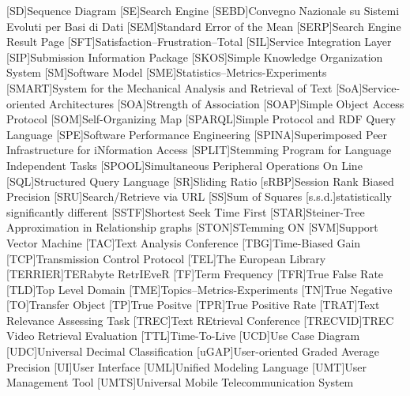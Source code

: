 [SD]{Sequence Diagram}
[SE]{Search Engine}
[SEBD]{Convegno Nazionale su Sistemi Evoluti per Basi di Dati}
[SEM]{Standard Error of the Mean}
[SERP]{Search Engine Result Page}
[SFT]{Satisfaction--Frustration--Total}
[SIL]{Service Integration Layer}
[SIP]{Submission Information Package}
[SKOS]{Simple Knowledge Organization System}
[SM]{Software Model}
[SME]{Statistics--Metrics-Experiments}
[SMART]{System for the Mechanical Analysis and Retrieval of Text}
[SoA]{Service-oriented Architectures}
[SOA]{Strength of Association}
[SOAP]{Simple Object Access Protocol}
[SOM]{Self-Organizing Map}
[SPARQL]{Simple Protocol and RDF Query Language}
[SPE]{Software Performance Engineering}
[SPINA]{Superimposed Peer Infrastructure for iNformation Access}
[SPLIT]{Stemming Program for Language Independent Tasks}
[SPOOL]{Simultaneous Peripheral Operations On Line}
[SQL]{Structured Query Language}
[SR]{Sliding Ratio}
[sRBP]{Session Rank Biased Precision}
[SRU]{Search/Retrieve via \acs{URL}}
[SS]{Sum of Squares}
[s.s.d.]{statistically significantly different}
[SSTF]{Shortest Seek Time First}
[STAR]{Steiner-Tree Approximation in Relationship graphs}
[STON]{STemming ON}
[SVM]{Support Vector Machine}
[TAC]{Text Analysis Conference}
[TBG]{Time-Biased Gain}
[TCP]{Transmission Control Protocol}
[TEL]{The European Library}
[TERRIER]{TERabyte RetrIEveR}
[TF]{Term Frequency}
[TFR]{True False Rate}
[TLD]{Top Level Domain}
[TME]{Topics--Metrics-Experiments}
[TN]{True Negative}
[TO]{Transfer Object}
[TP]{True Positve}
[TPR]{True Positive Rate}
[TRAT]{Text Relevance Assessing Task}
[TREC]{Text REtrieval Conference}
[TRECVID]{TREC Video Retrieval Evaluation}
[TTL]{Time-To-Live}
[UCD]{Use Case Diagram}
[UDC]{Universal Decimal Classification}
[uGAP]{User-oriented Graded Average Precision}
[UI]{User Interface}
[UML]{Unified Modeling Language}
[UMT]{User Management Tool}
[UMTS]{Universal Mobile Telecommunication System}
